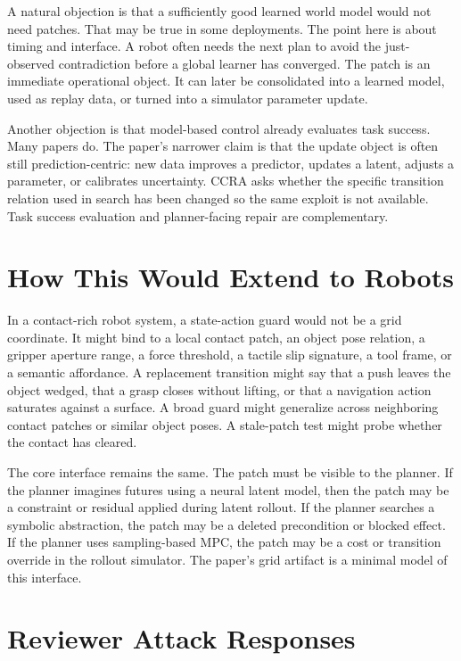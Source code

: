 \documentclass{article}
\begin{document}
A natural objection is that a sufficiently good learned world model would not need patches. That may be true in some deployments. The point here is about timing and interface. A robot often needs the next plan to avoid the just-observed contradiction before a global learner has converged. The patch is an immediate operational object. It can later be consolidated into a learned model, used as replay data, or turned into a simulator parameter update.

Another objection is that model-based control already evaluates task success. Many papers do. The paper's narrower claim is that the update object is often still prediction-centric: new data improves a predictor, updates a latent, adjusts a parameter, or calibrates uncertainty. CCRA asks whether the specific transition relation used in search has been changed so the same exploit is not available. Task success evaluation and planner-facing repair are complementary.

\section{How This Would Extend to Robots}

In a contact-rich robot system, a state-action guard would not be a grid coordinate. It might bind to a local contact patch, an object pose relation, a gripper aperture range, a force threshold, a tactile slip signature, a tool frame, or a semantic affordance. A replacement transition might say that a push leaves the object wedged, that a grasp closes without lifting, or that a navigation action saturates against a surface. A broad guard might generalize across neighboring contact patches or similar object poses. A stale-patch test might probe whether the contact has cleared.

The core interface remains the same. The patch must be visible to the planner. If the planner imagines futures using a neural latent model, then the patch may be a constraint or residual applied during latent rollout. If the planner searches a symbolic abstraction, the patch may be a deleted precondition or blocked effect. If the planner uses sampling-based MPC, the patch may be a cost or transition override in the rollout simulator. The paper's grid artifact is a minimal model of this interface.

\section{Reviewer Attack Responses}
\end{document}
